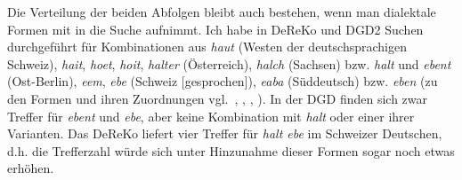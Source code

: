 Die Verteilung der beiden Abfolgen bleibt auch bestehen, wenn man dialektale Formen mit in die Suche aufnimmt. Ich habe in DeReKo und DGD2 Suchen durchgeführt für Kombinationen aus \textit{haut} (Westen der deutschsprachigen Schweiz), \textit{hait}, \textit{hoet}, \textit{hoit}, \textit{halter} (Österreich), \textit{halch} (Sachsen) bzw. \textit{halt} und \textit{ebent} (Ost-Berlin),\textit{ eem}, \textit{ebe} (Schweiz [gesprochen]), \textit{eaba} (Süddeutsch) bzw. \textit{eben} (zu den Formen und ihren Zuordnungen vgl.\ \citealt[167]{Protze1997}, \citealt[16]{Elspass2005}, \citealt[31]{Eichhoff1978}, \citealt{ElspassMoeller2012}). In der DGD finden sich zwar Treffer für \textit{ebent} und \textit{ebe}, aber keine Kombination mit \textit{halt} oder einer ihrer Varianten. Das DeReKo liefert vier Treffer für \textit{halt ebe} im Schweizer Deutschen, d.h. die Trefferzahl würde sich unter Hinzunahme dieser Formen sogar noch etwas erhöhen.

